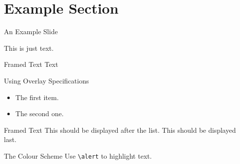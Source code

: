 \section{Example Section}
\begin{frame}[t]{An Example Slide}

This is just text.\hfill

\begin{block}{Framed Text}
Text \insertsectionhead
\end{block}
\end{frame}
\begin{frame}{Using Overlay Specifications}
\begin{itemize}[<+(1)->]
\item The first item.
\item The second one.
\end{itemize}
\pause
\begin{block}{Framed Text}
This should be displayed after the list.
\pause
This should be displayed last.
\end{block}
\end{frame}
\begin{frame}{The Colour Scheme}
Use \texttt{\textbackslash alert} to highlight \alert{text}.
\end{frame}
